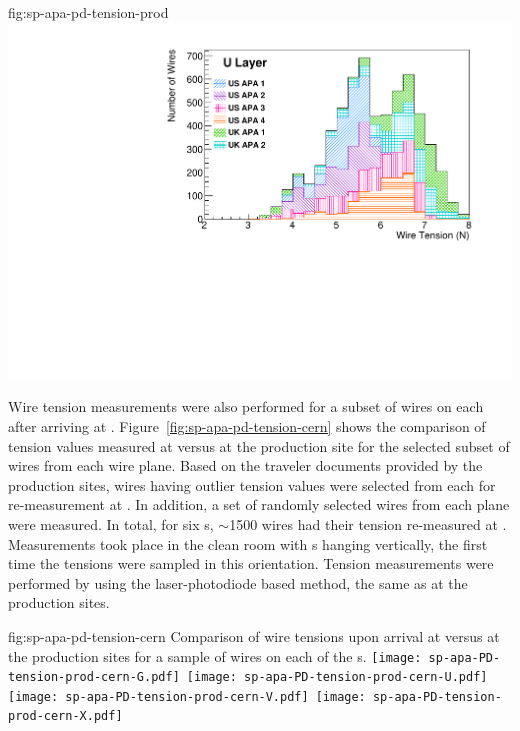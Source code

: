 \begin{dunefigure}{fig:sp-apa-pd-tension-prod}
\includegraphics[height=0.28\textheight,trim=0mm 0mm 0mm 0mm,clip]{graphics/sp-apa-U-layer-tensions.pdf}
\end{dunefigure}

Wire tension measurements were also performed for a subset of wires on each  after arriving at . Figure~\ref{fig:sp-apa-pd-tension-cern} shows the comparison of tension values measured at  versus at the production site for the selected subset of wires from each wire plane. Based on the traveler documents provided by the production sites, wires having outlier tension values were selected from each  for re-measurement at . In addition, a set of randomly selected wires from each plane were measured. In total, for six s, $\sim$1500 wires had their tension re-measured at . Measurements took place in the clean room with s hanging vertically, the first time the tensions were sampled in this orientation. Tension measurements were performed by using the laser-photodiode based method, the same as at the production sites. 

\begin{dunefigure}{fig:sp-apa-pd-tension-cern}
{Comparison of wire tensions upon arrival at  versus at the production sites for a sample of wires on each of the  s.}
\mbox{\texttt{[image: sp-apa-PD-tension-prod-cern-G.pdf]} %
\texttt{[image: sp-apa-PD-tension-prod-cern-U.pdf]}} \\
\vspace{3mm}
\mbox{\texttt{[image: sp-apa-PD-tension-prod-cern-V.pdf]} %
\texttt{[image: sp-apa-PD-tension-prod-cern-X.pdf]}}
\end{dunefigure}

